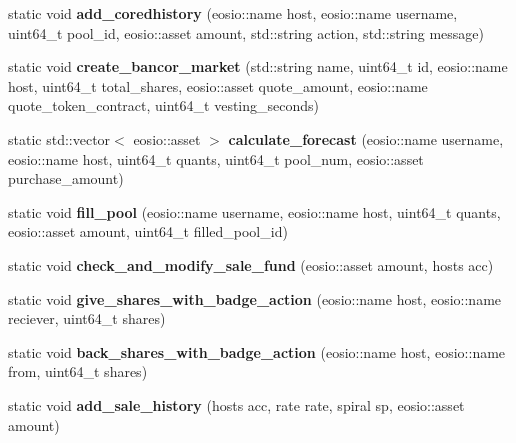 \begin{DoxyCompactItemize}
static void {\bfseries add\+\_\+coredhistory} (eosio\+::name host, eosio\+::name username, uint64\+\_\+t pool\+\_\+id, eosio\+::asset amount, std\+::string action, std\+::string message)
\item 
\mbox{\label{classeosio_1_1unicore_a1208fc7d6d8fcb23994c4ce42a651c85}} 
static void {\bfseries create\+\_\+bancor\+\_\+market} (std\+::string name, uint64\+\_\+t id, eosio\+::name host, uint64\+\_\+t total\+\_\+shares, eosio\+::asset quote\+\_\+amount, eosio\+::name quote\+\_\+token\+\_\+contract, uint64\+\_\+t vesting\+\_\+seconds)
\item 
\mbox{\label{classeosio_1_1unicore_a3cf163ec97724061329a3cc1e39259ea}} 
static std\+::vector$<$ eosio\+::asset $>$ {\bfseries calculate\+\_\+forecast} (eosio\+::name username, eosio\+::name host, uint64\+\_\+t quants, uint64\+\_\+t pool\+\_\+num, eosio\+::asset purchase\+\_\+amount)
\item 
\mbox{\label{classeosio_1_1unicore_a5cf210c3420d8c2722c2f92ed189c60c}} 
static void {\bfseries fill\+\_\+pool} (eosio\+::name username, eosio\+::name host, uint64\+\_\+t quants, eosio\+::asset amount, uint64\+\_\+t filled\+\_\+pool\+\_\+id)
\item 
\mbox{\label{classeosio_1_1unicore_aaf10ec7fdc6e4ec71ce6971dc459505b}} 
static void {\bfseries check\+\_\+and\+\_\+modify\+\_\+sale\+\_\+fund} (eosio\+::asset amount, hosts acc)
\item 
\mbox{\label{classeosio_1_1unicore_a98f5c70604ee0db416b761e72ce1406f}} 
static void {\bfseries give\+\_\+shares\+\_\+with\+\_\+badge\+\_\+action} (eosio\+::name host, eosio\+::name reciever, uint64\+\_\+t shares)
\item 
\mbox{\label{classeosio_1_1unicore_a367960828c31e770b19fc74f32dc7e22}} 
static void {\bfseries back\+\_\+shares\+\_\+with\+\_\+badge\+\_\+action} (eosio\+::name host, eosio\+::name from, uint64\+\_\+t shares)
\item 
\mbox{\label{classeosio_1_1unicore_a1b74aacdd14dea05ebd7db3a18703ca2}} 
static void {\bfseries add\+\_\+sale\+\_\+history} (hosts acc, rate rate, spiral sp, eosio\+::asset amount)
\end{DoxyCompactItemize}


